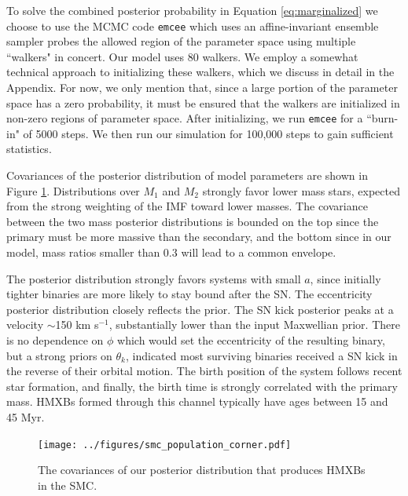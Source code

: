 \documentclass[12pt, preprint]{aastex}
\begin{document}
To solve the combined posterior probability in Equation \ref{eq:marginalized} we choose to use the MCMC code {\tt emcee} \citep{foreman-mackey13} which uses an affine-invariant ensemble sampler probes the allowed region of the parameter space using multiple ``walkers" in concert\citep{goodman10}. Our model uses 80 walkers. We employ a somewhat technical approach to initializing these walkers, which we discuss in detail in the Appendix. For now, we only mention that, since a large portion of the parameter space has a zero probability, it must be ensured that the walkers are initialized in non-zero regions of parameter space. After initializing, we run {\tt emcee} for a ``burn-in" of 5000 steps. We then run our simulation for 100,000 steps to gain sufficient statistics. 

Covariances of the posterior distribution of model parameters are shown in Figure \ref{fig:population_corner}. Distributions over $M_1$ and $M_2$ strongly favor lower mass stars, expected from the strong weighting of the IMF toward lower masses. The covariance between the two mass posterior distributions is bounded on the top since the primary must be more massive than the secondary, and the bottom since in our model, mass ratios smaller than 0.3 will lead to a common envelope.

The posterior distribution strongly favors systems with small $a$, since initially tighter binaries are more likely to stay bound after the SN. The eccentricity posterior distribution closely reflects the prior. The SN kick posterior peaks at a velocity $\sim$150 km s$^{-1}$, substantially lower than the input Maxwellian prior. There is no dependence on $\phi$ which would set the eccentricity of the resulting binary, but a strong priors on $\theta_k$, indicated most surviving binaries received a SN kick in the reverse of their orbital motion. The birth position of the system follows recent star formation, and finally, the birth time is strongly correlated with the primary mass. HMXBs formed through this channel typically have ages between 15 and 45 Myr.



\begin{figure}[h!]
\begin{center}
\texttt{[image: ../figures/smc\_population\_corner.pdf]}
\caption{ The covariances of our posterior distribution that produces HMXBs in the SMC. }
\label{fig:population_corner}
\end{center}
\end{figure}
\end{document}
